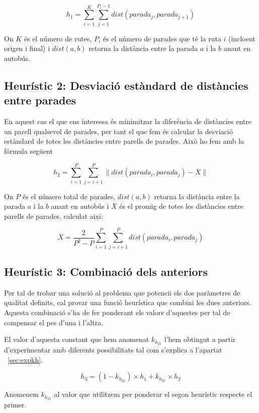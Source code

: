 \begin{center}
	\large
	\[
		h_1 = \sum_{i=1}^{K} \sum_{j=1}^{P_{i} - 1} dist(parada_j, parada_{j+1})
	\]
\end{center}

On $K$ és el número de rutes, $P_i$ és el número de parades que té la ruta $i$ (incloent origen i final) i $dist(a, b)$ retorna la distància entre la parada $a$ i la $b$ anant en autobús.


\subsection{Heurístic 2: Desviació estàndard de distàncies entre parades} %
\label{sub:heuristic2}

En aquest cas el que ens interessa és minimitzar la diferència de distàncies entre un parell qualsevol de parades, per tant el que fem és calcular la desviació estàndard de totes les distàncies entre parells de parades. Això ho fem amb la fórmula següent

\begin{center}
	\large
	\[
		h_2 = \sum_{i=1}^{P} \sum_{j=i+1}^{P} \| dist(parada_i, parada_j) - \overline{X} \|
	\]
\end{center}

On $P$ és el número total de parades, $dist(a, b)$ retorna la distància entre la parada $a$ i la $b$ anant en autobús i $\overline{X}$ és el promig de totes les distàncies entre parells de parades, calculat així:

\begin{center}
	\large
	\[
		\overline{X} = \dfrac{2}{P^2 - P} \sum_{i=1}^{P} \sum_{j=i+1}^{P} dist(parada_i, parada_j)
	\]
\end{center}



\subsection{Heurístic 3: Combinació dels anteriors} %
\label{sub:heuristic3}

Per tal de trobar una solució al problema que potencii els dos paràmetres de qualitat definits, cal provar una funció heurística que combini les dues anteriors. Aquesta combinació s'ha de fer ponderant els valors d'aquestes per tal de compensar el pes d'una i l'altra.

El valor d'aquesta constant que hem anomenat $k_{h_{21}}$ l'hem obtingut a partir d'experimentar amb diferents possibilitats tal com s'explica a l'apartat ~\ref{sec:expkh}.

\begin{center}
	\large
	\[
		h_3 = (1 - k_{h_{21}}) \times h_1 + k_{h_{21}} \times h_2
	\]
\end{center}

Anomenem $k_{h_{21}}$ al valor que utilitzem per ponderar el segon heurístic respecte el primer.

